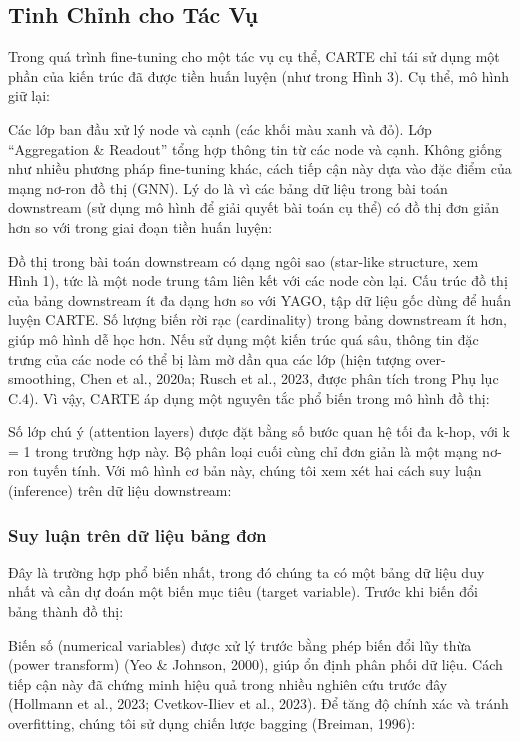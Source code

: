 \documentclass{article}
\begin{document}
\subsection{Tinh Chỉnh cho Tác Vụ}
Trong quá trình fine-tuning cho một tác vụ cụ thể, CARTE chỉ tái sử dụng một phần của kiến trúc đã được tiền huấn luyện (như trong Hình 3). Cụ thể, mô hình giữ lại:

Các lớp ban đầu xử lý node và cạnh (các khối màu xanh và đỏ).
Lớp “Aggregation \& Readout” tổng hợp thông tin từ các node và cạnh.
Không giống như nhiều phương pháp fine-tuning khác, cách tiếp cận này dựa vào đặc điểm của mạng nơ-ron đồ thị (GNN). Lý do là vì các bảng dữ liệu trong bài toán downstream (sử dụng mô hình để giải quyết bài toán cụ thể) có đồ thị đơn giản hơn so với trong giai đoạn tiền huấn luyện:

Đồ thị trong bài toán downstream có dạng ngôi sao (star-like structure, xem Hình 1), tức là một node trung tâm liên kết với các node còn lại.
Cấu trúc đồ thị của bảng downstream ít đa dạng hơn so với YAGO, tập dữ liệu gốc dùng để huấn luyện CARTE.
Số lượng biến rời rạc (cardinality) trong bảng downstream ít hơn, giúp mô hình dễ học hơn.
Nếu sử dụng một kiến trúc quá sâu, thông tin đặc trưng của các node có thể bị làm mờ dần qua các lớp (hiện tượng over-smoothing, Chen et al., 2020a; Rusch et al., 2023, được phân tích trong Phụ lục C.4). Vì vậy, CARTE áp dụng một nguyên tắc phổ biến trong mô hình đồ thị:

Số lớp chú ý (attention layers) được đặt bằng số bước quan hệ tối đa k-hop, với k = 1 trong trường hợp này.
Bộ phân loại cuối cùng chỉ đơn giản là một mạng nơ-ron tuyến tính.
Với mô hình cơ bản này, chúng tôi xem xét hai cách suy luận (inference) trên dữ liệu downstream:

\subsubsection{Suy luận trên dữ liệu bảng đơn}
Đây là trường hợp phổ biến nhất, trong đó chúng ta có một bảng dữ liệu duy nhất và cần dự đoán một biến mục tiêu (target variable). Trước khi biến đổi bảng thành đồ thị:

Biến số (numerical variables) được xử lý trước bằng phép biến đổi lũy thừa (power transform) (Yeo \& Johnson, 2000), giúp ổn định phân phối dữ liệu. Cách tiếp cận này đã chứng minh hiệu quả trong nhiều nghiên cứu trước đây (Hollmann et al., 2023; Cvetkov-Iliev et al., 2023).
Để tăng độ chính xác và tránh overfitting, chúng tôi sử dụng chiến lược bagging (Breiman, 1996):
\end{document}

